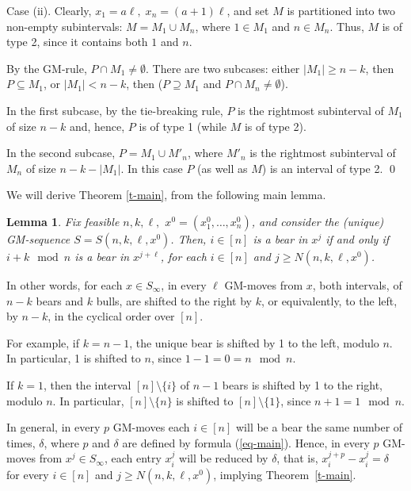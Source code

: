 \documentclass[10pt]{article}
\newtheorem{lemma}{Lemma}
\theoremstyle{definition}
\begin{document}
\medskip 

Case (ii). Clearly,   
$x_1 = a \ell, \; x_n = (a+1) \ell$, and  
set $M$ is partitioned into two non-empty subintervals:  
$M = M_1 \cup M_n$, where $1 \in M_1$  and  $n \in M_n$. 
Thus, $M$ is of type 2, since it contains both $1$ and $n$. 

By the GM-rule, $P \cap M_1 \neq \emptyset$. 
There are two subcases: 
either  $|M_1| \geq n-k$, 
then  $P \subseteq M_1$, or 
$|M_1| < n-k$, then  
($P \supseteq M_1$  and  $P \cap M_n \neq \emptyset$). 

In the first subcase, by the  tie-breaking rule,  
$P$  is the rightmost subinterval of  $M_1$  of size $n-k$ 
and, hence, $P$ is of type 1 (while $M$ is of type 2).

In the second subcase, $P = M_1 \cup M'_n$, 
where $M'_n$ is the rightmost subinterval of $M_n$ 
of size  $n-k-|M_1|$. 
In this case $P$  (as well as $M$) is 
an interval of type 2. 
\qed 

\medskip 

We will derive Theorem \ref{t-main}, 
from the following main lemma. 

\begin{lemma}
\label{l-main} 
Fix feasible  $n,k,\ell,$  
$x^0 = (x^0_1, \ldots, x^0_n)$,    
and consider the (unique) 
GM-sequence  $S = S(n,k,\ell,x^0)$.   
Then, $i \in [n]$  is a bear in  $x^j$  
if and only if 
$i + k \mod n$  is a bear in  $x^{j + \ell}$,  
for each $i \in [n]$ and $j \geq N(n,k,\ell,x^0)$.   
\end{lemma}

In other words, for each  $x \in S_\infty$, 
in every $\ell$ GM-moves from  $x$, both intervals, 
of $n-k$  bears and  $k$  bulls,   
are shifted to the right by  $k$, 
or equivalently, to the left, by $n-k$, 
in the cyclical order over $[n]$. 

For example, if  $k = n-1$,  
the unique bear is shifted by 1 to the left, 
modulo $n$. 
In particular, 1 is shifted to $n$, 
since $1-1 = 0 = n \mod n$.

If  $k = 1$, then the interval 
$[n] \setminus \{i\}$  of $n-1$ bears 
is shifted by 1 to the right, modulo $n$. 
In particular, $[n] \setminus \{n\}$ 
is shifted to  $[n] \setminus \{1\}$,  
since $n+1 = 1 \mod n$. 

In general, in every $p$  GM-moves 
each  $i \in [n]$  will be a bear 
the same number of times, $\delta$, 
where $p$ and $\delta$ are defined by 
formula (\ref{eq-main}). 
Hence, in every $p$ GM-moves from $x^j \in S_\infty$,  
each entry $x^j_i$  will be reduced by $\delta$, 
that is, $x_i^{j+p} - x_i^j = \delta$  for every 
$i \in [n]$ and $j \geq N(n,k,\ell,x^0)$, 
implying Theorem~\ref{t-main}.
\end{document}
